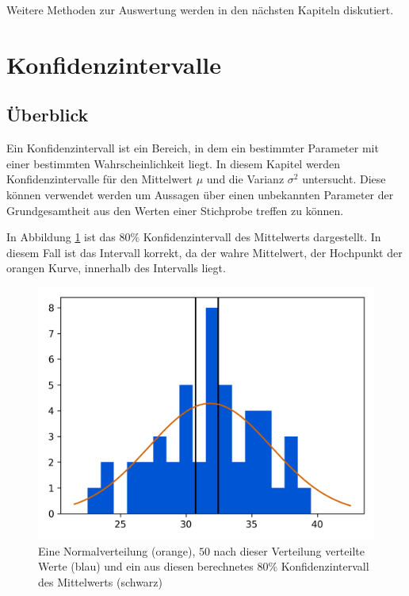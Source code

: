 \documentclass[10pt,twocolumn]{scrartcl}
\begin{document}
			Weitere Methoden zur Auswertung werden in den nächsten Kapiteln diskutiert.

\section{Konfidenzintervalle}
	\subsection{Überblick}
		Ein Konfidenzintervall ist ein Bereich, in dem ein bestimmter Parameter mit einer bestimmten Wahrscheinlichkeit liegt. In diesem Kapitel werden Konfidenzintervalle für den Mittelwert $\mu$ und die Varianz $\sigma^2$ untersucht. Diese können verwendet werden um Aussagen über einen unbekannten Parameter der Grundgesamtheit aus den Werten einer Stichprobe treffen zu können.

		In Abbildung \ref{fig_mean_interval_hist} ist das $80\%$ Konfidenzintervall des Mittelwerts dargestellt. In diesem Fall ist das Intervall korrekt, da der wahre Mittelwert, der Hochpunkt der orangen Kurve, innerhalb des Intervalls liegt.
		\begin{figure}[h]%
			\centering
			\includegraphics[width=0.9\columnwidth]{images/histogram_50_interval_1.png}
			\caption{Eine Normalverteilung (orange), $50$ nach dieser Verteilung verteilte Werte (blau) und ein aus diesen berechnetes $80\%$ Konfidenzintervall des Mittelwerts (schwarz)}
			\label{fig_mean_interval_hist}
		\end{figure}
\end{document}
